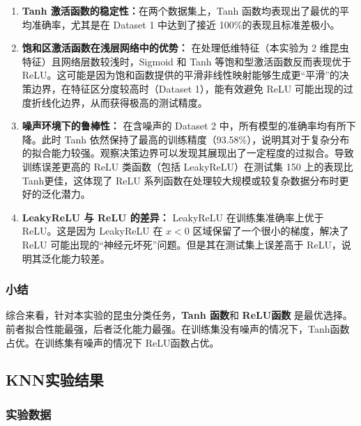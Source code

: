 \begin{enumerate}
	
	\item \textbf{Tanh 激活函数的稳定性：}在两个数据集上，Tanh 函数均表现出了最优的平均准确率，尤其是在 Dataset 1 中达到了接近 100\%的表现且标准差极小。
	
	\item \textbf{饱和区激活函数在浅层网络中的优势：}
	在处理低维特征（本实验为 2 维昆虫特征）且网络层数较浅时，Sigmoid 和 Tanh 等饱和型激活函数反而表现优于 ReLU。这可能是因为饱和函数提供的平滑非线性映射能够生成更“平滑”的决策边界，在特征区分度较高时（Dataset 1），能有效避免 ReLU 可能出现的过度折线化边界，从而获得极高的测试精度。
	
	\item \textbf{噪声环境下的鲁棒性：}
	在含噪声的 Dataset 2 中，所有模型的准确率均有所下降。此时 Tanh 依然保持了最高的训练精度（93.58\%），说明其对于复杂分布的拟合能力较强。观察决策边界可以发现其展现出了一定程度的过拟合。导致训练误差更高的 ReLU 类函数（包括 LeakyReLU）在测试集 150 上的表现比Tanh更佳，这体现了 ReLU 系列函数在处理较大规模或较复杂数据分布时更好的泛化潜力。
	
	\item \textbf{LeakyReLU 与 ReLU 的差异：}
	LeakyReLU 在训练集准确率上优于 ReLU。这是因为 LeakyReLU 在 $x < 0$ 区域保留了一个很小的梯度，解决了 ReLU 可能出现的“神经元坏死”问题。但是其在测试集上误差高于 ReLU，说明其泛化能力较差。
\end{enumerate}\subsubsection{小结}综合来看，针对本实验的昆虫分类任务，\textbf{Tanh 函数}和 \textbf{ReLU函数} 是最优选择。前者拟合性能最强，后者泛化能力最强。在训练集没有噪声的情况下，Tanh函数占优。在训练集有噪声的情况下 ReLU函数占优。

\subsection{KNN实验结果}

\subsubsection{实验数据}

